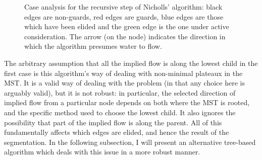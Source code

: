 \begin{figure}[t]
\begin{center}
	\hspace{4mm}%
\end{center}
\caption{Case analysis for the recursive step of Nicholls' algorithm: black edges are non-guards, red edges are guards, blue edges are those which have been elided and the green edge is the one under active consideration. The arrow (on the node) indicates the direction in which the algorithm presumes water to flow.}
\label{fig:segmentation-waterfall-nicholls-cases}
\end{figure}

The arbitrary assumption that all the implied flow is along the lowest child in the first case is this algorithm's way of dealing with non-minimal plateaux in the MST. It is a valid way of dealing with the problem (in that any choice here is arguably valid), but it is not robust: in particular, the selected direction of implied flow from a particular node depends on both where the MST is rooted, and the specific method used to choose the lowest child. It also ignores the possibility that part of the implied flow is along the parent. All of this fundamentally affects which edges are elided, and hence the result of the segmentation. In the following subsection, I will present an alternative tree-based algorithm which deals with this issue in a more robust manner.

